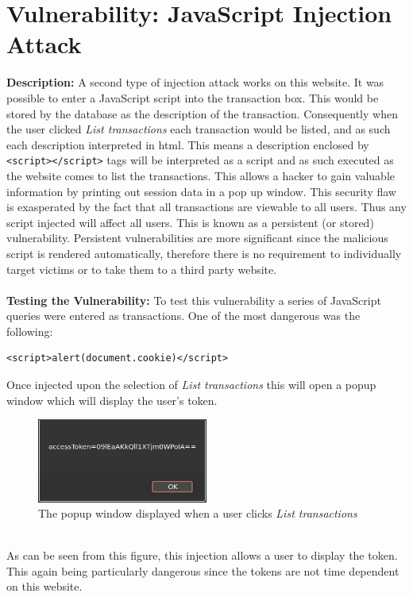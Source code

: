 \section{Vulnerability: JavaScript Injection Attack}
\label{sec:background}
\textbf{Description:} A second type of injection attack works on this website. It was possible to enter a JavaScript script into the transaction box. This would be stored by
the database as the description of the transaction. Consequently when the user clicked \textit{List transactions} each transaction would be listed, and as such each description
interpreted in html. This means a description enclosed by \verb|<script></script>| tags will be interpreted as a script and as such executed as the website comes to list the
transactions. This allows a hacker to gain valuable information by printing out session data in a pop up window. This security flaw is exasperated by the fact that all transactions
are viewable to all users. Thus any script injected will affect all users. This is known as a persistent (or stored) vulnerability. Persistent vulnerabilities are more significant
since the malicious script is rendered automatically, therefore there is no requirement to individually target victims or to take them to a third party website.\\ \\
\textbf{Testing the Vulnerability:} To test this vulnerability a series of JavaScript queries were entered as transactions. One of the most dangerous was the following:
\begin{verbatim}
<script>alert(document.cookie)</script>
\end{verbatim}
Once injected upon the selection of \textit{List transactions} this will open a popup window which will display the user's token.
\begin{figure}[h]
  \centering
  \includegraphics[width=0.5\textwidth]{figs/popup.png}
  \caption{The popup window displayed when a user clicks \textit{List transactions}}
  \label{popup}
\end{figure}\\
As can be seen from this figure, this injection allows a user to display the token. This again being particularly dangerous since the tokens are not time dependent on this website.
